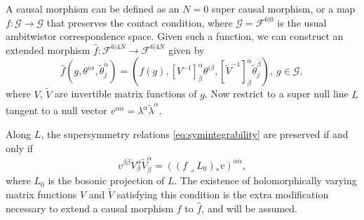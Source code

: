 \documentclass[12pt]{article}
\newcommand{\mbb}{\mathbb}
\newcommand{\ts}{\ \,}
\begin{document}
A causal morphism can be defined as an $N=0$ super causal morphism, or a map $f:\mathcal{G}\rightarrow \mathcal{G}$ that preserves the contact condition, where $\mathcal{G}=\mathcal{F}^{6\vert 0}$ is the usual ambitwistor correspondence space.   Given such a function, we can construct an extended morphism $\hat{f}:\mathcal{F}^{6\vert 4N}\rightarrow\mathcal{F}^{6\vert 4N}$ given by
\begin{equation}\label{eq:extcaus}
\hat{f}(g,\theta^{i\alpha},\tilde{\theta}_j^{\dot{\alpha}})=(f(g),[V^{-1}]^\alpha_{\beta}\theta^{i\beta },[\tilde{V}^{-1}]^{\dot{\alpha}}_{ \dot{\beta}}\tilde{\theta}_j^{\dot{\beta}}), \ g\in \mathcal{G},
\end{equation}
where $V$, $\tilde{V}$ are invertible matrix functions of $g$.  Now restrict to a super null line $L$ tangent to a null vector $v^{\alpha\dot{\alpha}}=\lambda^{\alpha}\tilde{\lambda}^{\dot{\alpha}}$.  
\begin{comment}
the covariant derivative operators transform as
\begin{align}
&(f^{(N)}\lrcorner L)_*(\lambda^\alpha Q_{i\alpha})=V^\alpha_{\ts \beta}\lambda^\beta Q_{i\alpha},\\
&(f^{(N)}\lrcorner L)_*(\tilde{\lambda}^{\dot{\alpha}} \tilde{Q}^i_{\dot{\alpha}})=\tilde{V}^{\dot{\alpha}}_{\ts \dot{\beta}}\tilde{\lambda}^{\dot{\beta}} Q^i_{\dot{\alpha}}, \\
(f^{(N)}\lrcorner L)_*
\end{align}
\end{comment}
Along $L$, the supersymmetry relations \eqref{eq:symintegrability} are preserved if and only if
\begin{equation}
v^{\beta\dot{\beta}}V^\alpha_{\beta}\tilde{V}^{\dot{\alpha}}_{\dot{\beta}}=((f\lrcorner L_0)_*v)^{\alpha\dot{\alpha}},
\end{equation}
where $L_0$ is the bosonic projection of $L$.    The existence of holomorphically varying matrix functions $V$ and $\tilde{V}$ satisfying this condition is the extra modification necessary to extend a causal morphism $f$ to $\hat{f}$, and will be assumed.
\begin{comment}
With Euclidean reality conditions these can possibly be understood as a lift of the $SL(4,\mbb{C})$ connection to the spin bundle.  This must be understood better.
\end{comment}  
\end{document}
